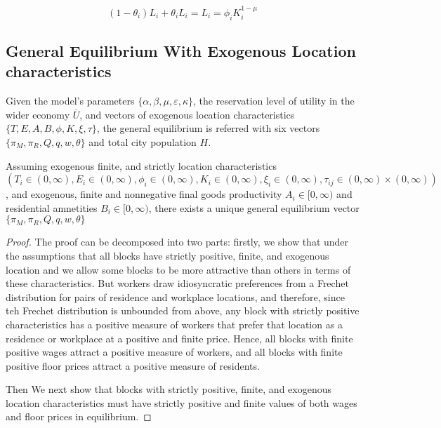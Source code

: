 \begin{equation}
  (1 - \theta_i)L_i + \theta_i L_i = L_i = \phi_i K_i^{1 - \mu}
\end{equation}

\subsection{General Equilibrium With Exogenous Location characteristics}

Given the model's parameters $\{\alpha, \beta, \mu, \varepsilon, \kappa\}$, the reservation level of utility in the wider economy $\overline{U}$, and vectors of exogenous location characteristics $\{T, E, A, B, \phi, K, \xi, \tau\}$, the general equilibrium is referred with six vectors $\{\pi_M, \pi_R, Q, q, w, \theta\}$ and total city population $H$.

\begin{proposition}
  Assuming exogenous finite, and strictly location characteristics $(T_i \in (0, \infty), E_i \in (0, \infty), \phi_i \in (0, \infty), K_i \in (0, \infty), \xi_i \in (0, \infty), \tau_{ij} \in (0, \infty) \times (0, \infty))$, and exogenous, finite and nonnegative final goods productivity $A_i \in [0, \infty)$ and residential amnetities $B_i \in [0, \infty)$, there exists a unique general equilibrium vector $\{\pi_M, \pi_R, Q, q, w, \theta\}$
\end{proposition}

\begin{proof}
  The proof can be decomposed into two parts: firstly, we show that under the assumptions that all blocks have strictly positive, finite, and exogenous location and we allow some blocks to be more attractive than others in terms of these characteristics. But workers draw idiosyncratic preferences from a Frechet distribution for pairs of residence and workplace locations, and therefore, since teh Frechet distribution is unbounded from above, any block with strictly positive characteristics has a positive measure of workers that prefer that location as a residence or workplace at a positive and finite price. Hence, all blocks with finite positive wages attract a positive measure of workers, and all blocks with finite positive floor prices attract a positive measure of residents.

  Then We next show that blocks with strictly positive, finite, and exogenous location characteristics must have strictly positive and finite values of both wages and floor prices in equilibrium.
\end{proof}

